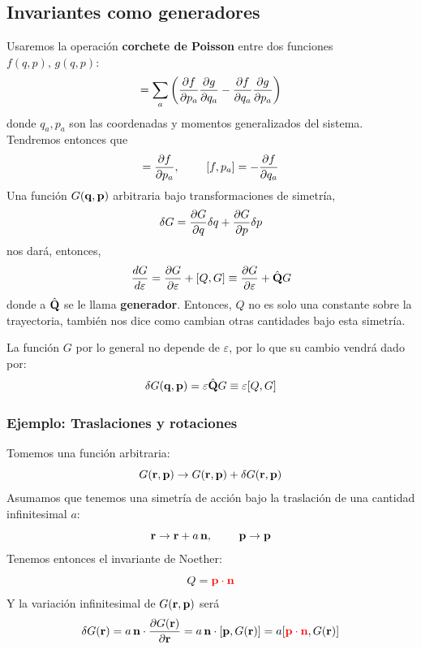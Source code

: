 \documentclass[]{article}
\numberwithin{equation}{section}
\begin{document}
\subsection{Invariantes como generadores}
Usaremos la operación \textbf{corchete de Poisson} entre dos funciones \(f(q,p), \, g(q,p)\):
\begin{equation}
	[f, g] = \sum_{a} \left( \pd{f}{p_a}\pd{g}{q_a} - \pd{f}{q_a}\pd{g}{p_a} \right) \label{poisson}
\end{equation}
donde \(q_a, p_a\) son las coordenadas y momentos generalizados del sistema. Tendremos entonces que
\begin{equation}
	[f,q_a] = \pd{f}{p_a}, ~~~~~~~ [f,p_a] = -\pd{f}{q_a}
\end{equation}
Una función \(G(\mathbf{q},\mathbf{p})\) arbitraria bajo transformaciones de simetría,
\begin{equation}
	\delta G = \dfrac{\partial G}{\partial q} \delta q + \dfrac{\partial G}{\partial p} \delta p
\end{equation}
nos dará, entonces,
\begin{equation}
	\dfrac{d G}{d \varepsilon} = \dfrac{\partial G}{\partial \varepsilon} + [Q,G] \equiv \dfrac{\partial G}{\partial \varepsilon} + \hat{\mathbf{Q}} G
\end{equation}
donde a \(\hat{\mathbf{Q}}\) se le llama \textbf{generador}. Entonces, \(Q\) no es solo una constante sobre la trayectoria, también nos dice como cambian otras cantidades bajo esta simetría.

La función \(G\) por lo general no depende de \(\varepsilon\), por lo que su cambio vendrá dado por:
\begin{equation}
	\delta G(\mathbf{q},\mathbf{p}) = \varepsilon \hat{\mathbf{Q}} G \equiv \varepsilon [Q,G]
\end{equation}

\subsubsection{Ejemplo: Traslaciones y rotaciones}
Tomemos una función arbitraria:
\begin{equation*}
	G(\mathbf{r},\mathbf{p}) \rightarrow G(\mathbf{r},\mathbf{p}) + \delta G(\mathbf{r},\mathbf{p})
\end{equation*}
Asumamos que tenemos una simetría de acción bajo la traslación de una cantidad infinitesimal \(a\):
\begin{equation*}
	\mathbf{r} \rightarrow \mathbf{r} + a \, \mathbf{n}, ~~~~~~~ \mathbf{p} \rightarrow \mathbf{p}
\end{equation*}
Tenemos entonces el invariante de Noether:
\begin{equation*}
	Q = \textcolor{red}{\mathbf{p}\cdot\mathbf{n}}
\end{equation*}
Y la variación infinitesimal de \(G(\mathbf{r},\mathbf{p})\) será
\begin{equation*}
	\delta G(\mathbf{r}) = a \, \mathbf{n} \cdot \dfrac{\partial G(\mathbf{r})}{\partial \mathbf{r}} = a \, \mathbf{n} \cdot [\mathbf{p}, G(\mathbf{r})] = a[\textcolor{red}{\mathbf{p}\cdot\mathbf{n}}, G(\mathbf{r})]
\end{equation*}
\end{document}
